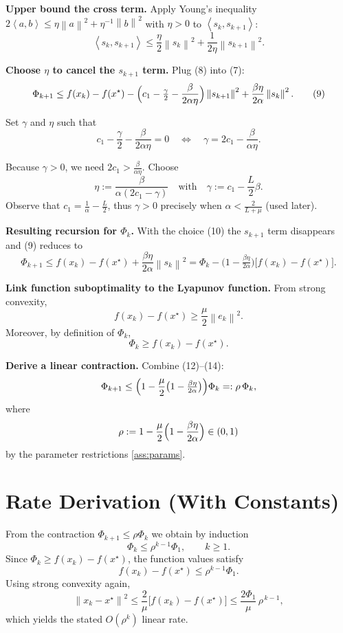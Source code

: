 \documentclass{article}
\newcommand{\norm}[1]{\left\lVert#1\right\rVert}
\newcommand{\inner}[2]{\left\langle #1,#2\right\rangle}
\begin{document}
\begin{enumerate}[label={[\textbf{Step \arabic*}]}]
\item \textbf{Upper bound the cross term.}  
Apply Young’s inequality $2\inner{a}{b}\le \eta\norm{a}^{2}+\eta^{-1}\norm{b}^{2}$ with $\eta>0$ to $\inner{s_k}{s_{k+1}}$:
\[
\inner{s_k}{s_{k+1}}\le \frac{\eta}{2}\norm{s_k}^{2}+\frac{1}{2\eta}\norm{s_{k+1}}^{2}. \tag{8}
\]

\item \textbf{Choose $\eta$ to cancel the $s_{k+1}$ term.}  
Plug (8) into (7):
\[
\Phi_{k+1}\le f(x_k)-f(x^{\star})
-\Bigl(c_1-\tfrac{\gamma}{2}-\frac{\beta}{2\alpha\eta}\Bigr)\norm{s_{k+1}}^{2}
+\frac{\beta\eta}{2\alpha}\norm{s_k}^{2}. \tag{9}
\]

Set $\gamma$ and $\eta$ such that
\[
c_1-\frac{\gamma}{2}-\frac{\beta}{2\alpha\eta}=0
\quad\Longleftrightarrow\quad
\gamma=2c_1-\frac{\beta}{\alpha\eta}. \tag{10}
\]

Because $\gamma>0$, we need $2c_1>\frac{\beta}{\alpha\eta}$. Choose
\[
\eta:=\frac{\beta}{\alpha(2c_1-\gamma)}\quad\text{with}\quad
\gamma:=c_1-\frac{L}{2}\beta. \tag{11}
\]
Observe that $c_1=\frac{1}{\alpha}-\frac{L}{2}$, thus $\gamma>0$ precisely when $\alpha<\frac{2}{L+\mu}$ (used later).

\item \textbf{Resulting recursion for $\Phi_k$.}  
With the choice (10) the $s_{k+1}$ term disappears and (9) reduces to
\[
\Phi_{k+1}\le f(x_k)-f(x^{\star})+\frac{\beta\eta}{2\alpha}\norm{s_k}^{2}
= \Phi_k-\bigl(1-\tfrac{\beta\eta}{2\alpha}\bigr)\bigl[f(x_k)-f(x^{\star})\bigr]. \tag{12}
\]

\item \textbf{Link function suboptimality to the Lyapunov function.}  
From strong convexity,
\[
f(x_k)-f(x^{\star})\ge\frac{\mu}{2}\norm{e_k}^{2}. \tag{13}
\]
Moreover, by definition of $\Phi_k$,
\[
\Phi_k\ge f(x_k)-f(x^{\star}). \tag{14}
\]

\item \textbf{Derive a linear contraction.}  
Combine (12)–(14):
\[
\Phi_{k+1}\le\Bigl(1-\frac{\mu}{2}\bigl(1-\tfrac{\beta\eta}{2\alpha}\bigr)\Bigr)\Phi_k
=: \rho\,\Phi_k,
\]
where
\[
\rho:=1-\frac{\mu}{2}\Bigl(1-\frac{\beta\eta}{2\alpha}\Bigr)\in(0,1)
\]
by the parameter restrictions \eqref{ass:params}. \hfill\qedsymbol
\end{enumerate}

\section*{Rate Derivation (With Constants)}
From the contraction $\Phi_{k+1}\le\rho\Phi_k$ we obtain by induction
\[
\Phi_k\le\rho^{k-1}\Phi_1,\qquad k\ge1.
\]
Since $\Phi_k\ge f(x_k)-f(x^{\star})$, the function values satisfy
\[
f(x_k)-f(x^{\star})\le\rho^{k-1}\Phi_1.
\]
Using strong convexity again,
\[
\norm{x_k-x^{\star}}^{2}\le\frac{2}{\mu}\bigl[f(x_k)-f(x^{\star})\bigr]
\le\frac{2\Phi_1}{\mu}\,\rho^{\,k-1},
\]
which yields the stated $O(\rho^{k})$ linear rate.
\end{document}
